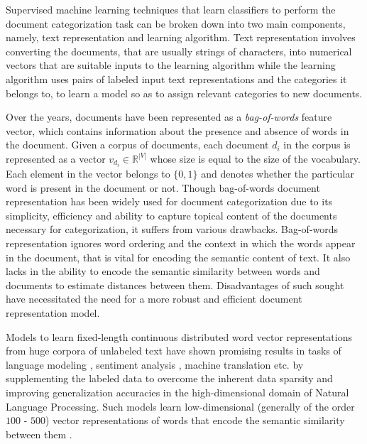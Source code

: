 Supervised machine learning techniques that learn classifiers to perform the document categorization task can be broken down into two main components, namely, text representation and learning algorithm. 
Text representation involves converting the documents, that are usually strings of characters, into numerical vectors that are suitable inputs to the learning algorithm while the learning algorithm uses pairs of labeled input text representations and the categories it belongs to, to learn a model so as to assign relevant categories to new documents. 

Over the years, documents have been represented as a \emph{bag-of-words} feature vector, which contains information about the presence and absence of words in the document. Given a corpus of documents, each document $d_{i}$ in the corpus is represented as a vector $v_{d_{i}} \in \mathbb{R}^{|V|}$ whose size is equal to the size of the vocabulary. Each element in the vector belongs to $\{0, 1\}$ and denotes whether the particular word is present in the document or not. Though bag-of-words document representation has been widely used for document categorization due to its simplicity, efficiency and ability to capture topical content of the documents necessary for categorization, it suffers from various drawbacks. Bag-of-words representation ignores word ordering and the context in which the words appear in the document, that is vital for encoding the semantic content of text. It also lacks in the ability to encode the semantic similarity between words and documents to estimate distances between them. Disadvantages of such sought have necessitated the need for a more robust and efficient document representation model.

Models to learn fixed-length continuous distributed word vector representations from huge corpora of unlabeled text have shown promising results in tasks of language modeling \citep{bengio2003neural}, sentiment analysis \citep{socher2013recursive}, machine translation \citep{zou2013bilingual} etc. by supplementing the labeled data to overcome the inherent data sparsity and improving generalization accuracies in the high-dimensional domain of Natural Language Processing. Such models learn low-dimensional (generally of the order $100$ - $500$) vector representations of words that encode the semantic similarity between them \citep{mikolov2013efficient}. 

